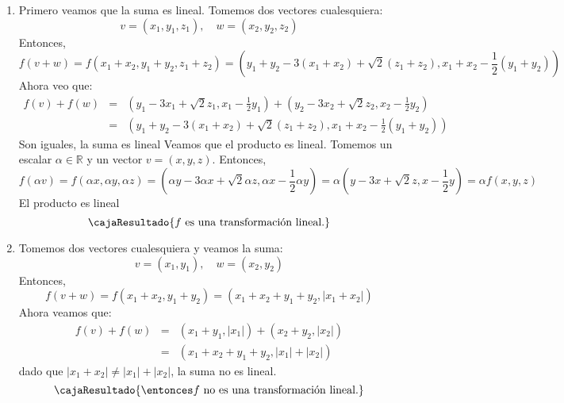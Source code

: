 \begin{enumerate}[label=(\alph*)]
  \item
        Primero veamos que la suma es lineal. Tomemos dos vectores cualesquiera:
        $$
          v = (x_1, y_1, z_1), \quad w = (x_2, y_2, z_2)
        $$
        Entonces,
        $$
          f(v + w) = f(x_1 + x_2, y_1 + y_2, z_1 + z_2) =
          (y_1 + y_2 - 3(x_1 + x_2) + \sqrt{2} (z_1 + z_2), x_1 + x_2 - \frac{1}{2} (y_1 + y_2))
        $$
        Ahora veo que:
        $$
          \begin{array}{rcl}
            f(v) + f(w) & = & (y_1 - 3x_1 + \sqrt{2} z_1, x_1 - \frac{1}{2} y_1) + (y_2 - 3x_2 + \sqrt{2} z_2, x_2 - \frac{1}{2} y_2) \\
                        & = & (y_1 + y_2 - 3(x_1 + x_2) + \sqrt{2} (z_1 + z_2), x_1 + x_2 - \frac{1}{2} (y_1 + y_2))
          \end{array}
        $$
        Son iguales, la suma es lineal
        Veamos que el producto es lineal. Tomemos un escalar $\alpha \in \mathbb{R}$ y un vector $v = (x, y, z)$. Entonces,
        $$
          f(\alpha v) = f(\alpha x, \alpha y, \alpha z) =
          (\alpha y - 3\alpha x + \sqrt{2} \alpha z, \alpha x - \frac{1}{2} \alpha y) =
          \alpha (y - 3x + \sqrt{2}z, x - \frac{1}{2} y) = \alpha f(x, y, z)
        $$
        El producto es lineal
        $$
          \cajaResultado{
            f \text{ es una transformación lineal.}
          }
        $$

  \item
        Tomemos dos vectores cualesquiera y veamos la suma:
        $$
          v = (x_1, y_1), \quad w = (x_2, y_2)
        $$
        Entonces,
        $$
          f(v + w) = f(x_1 + x_2, y_1 + y_2) =
          (x_1 + x_2 + y_1 + y_2, |x_1 + x_2|)
        $$
        Ahora veamos que:
        $$
          \begin{array}{rcl}
            f(v) + f(w) & = & (x_1 + y_1, |x_1|) + (x_2 + y_2, |x_2|) \\
                        & = & (x_1 + x_2 + y_1 + y_2, |x_1| + |x_2|)
          \end{array}
        $$
        dado que $|x_1 + x_2| \neq |x_1| + |x_2|$, la suma no es lineal.
        $$
          \cajaResultado{
            \entonces f \text{ no es una transformación lineal.}
          }
        $$


\end{enumerate}
